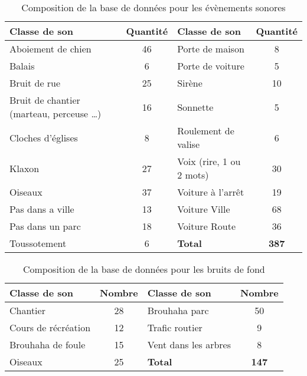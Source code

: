 \begin{table}[h]
\centering
\begin{tabular}{m{5cm} c |m{5cm} c}
\hline
\textbf{Classe de son} & \textbf{Quantité} & \textbf{Classe de son} & \textbf{Quantité} \\ \hline 
Aboiement de chien & 46 & Porte de maison & 8\\ \hline
Balais & 6 & Porte de voiture & 5\\ \hline
Bruit de rue & 25 & Sirène & 10 \\ \hline
Bruit de chantier (marteau, perceuse \dots) & 16 & Sonnette & 5 \\ \hline
Cloches d'églises & 8 & Roulement de valise & 6 \\ \hline
Klaxon & 27 & Voix (rire, 1 ou 2 mots) & 30 \\ \hline
Oiseaux & 37 & Voiture à l'arrêt & 19 \\ \hline
Pas dans a ville & 13 & Voiture Ville & 68 \\ \hline
Pas dans un parc & 18 & Voiture Route & 36 \\ \hline
Toussotement & 6 &\textbf{Total} & \textbf{387}\\ \hline
\end{tabular}
\caption{Composition de la base de données pour les évènements sonores}
\label{tab:dataBaseEv}
\end{table}

\begin{table}[h]
\centering
\begin{tabular}{m{5cm} c |m{5cm} c}
\hline
\textbf{Classe de son} & \textbf{Nombre} & \textbf{Classe de son} & \textbf{Nombre} \\ \hline
Chantier & 28 & Brouhaha parc & 50 \\ \hline
Cours de récréation & 12 & Trafic routier & 9 \\ \hline
Brouhaha de foule & 15 & Vent dans les arbres & 8 \\ \hline
Oiseaux & 25 & \textbf{Total} & \textbf{147} \\ \hline
\end{tabular}
\caption{Composition de la base de données pour les bruits de fond}
\label{tab:dataBaseBcg}
\end{table}

